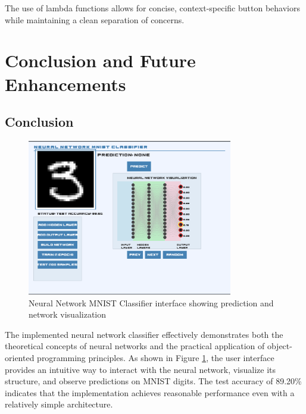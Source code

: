 \documentclass[12pt]{article}
\begin{document}
The use of lambda functions allows for concise, context-specific button behaviors while maintaining a clean separation of concerns.

\section{Conclusion and Future Enhancements}

\subsection{Conclusion}

\begin{figure}[H]
    \centering
    \includegraphics[width=0.8\textwidth]{test.png}
    \caption{Neural Network MNIST Classifier interface showing prediction and network visualization}
    \label{fig:test_interface}
\end{figure}

The implemented neural network classifier effectively demonstrates both the theoretical concepts of neural networks and the practical application of object-oriented programming principles. As shown in Figure \ref{fig:test_interface}, the user interface provides an intuitive way to interact with the neural network, visualize its structure, and observe predictions on MNIST digits. The test accuracy of 89.20\% indicates that the implementation achieves reasonable performance even with a relatively simple architecture.
\end{document}
